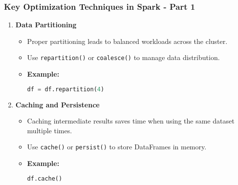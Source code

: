 \documentclass[aspectratio=169]{beamer}
\begin{document}
\begin{frame}
    \frametitle{Key Optimization Techniques in Spark - Part 1}
    \begin{enumerate}
        \item \textbf{Data Partitioning}
            \begin{itemize}
                \item Proper partitioning leads to balanced workloads across the cluster.
                \item Use \texttt{repartition()} or \texttt{coalesce()} to manage data distribution.
                \item \textbf{Example:}
                \begin{lstlisting}[language=Python]
df = df.repartition(4)
                \end{lstlisting}
            \end{itemize}
        \item \textbf{Caching and Persistence}
            \begin{itemize}
                \item Caching intermediate results saves time when using the same dataset multiple times.
                \item Use \texttt{cache()} or \texttt{persist()} to store DataFrames in memory.
                \item \textbf{Example:}
                \begin{lstlisting}[language=Python]
df.cache()
                \end{lstlisting}
            \end{itemize}
    \end{enumerate}
\end{frame}
\end{document}
